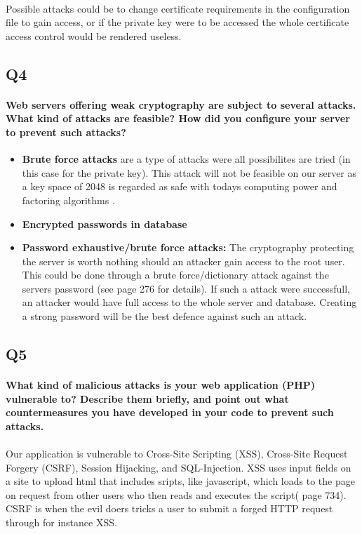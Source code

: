 \documentclass[a4paper,11pt]{article}
\begin{document}
\paragraph{}Possible attacks could be to change certificate requirements in the configuration file to gain access, or if the private key were to be accessed the whole certificate access control would be rendered useless.
\subsection{Q4}
\paragraph{Web servers offering weak cryptography are subject to several attacks. What kind of attacks are feasible? How did you conﬁgure your server to prevent such attacks?}
\begin{itemize}
	\item \textbf{Brute force attacks} are a type of attacks were all possibilites are tried (in this case for the private key). This attack will not be feasible on our server as a key space of 2048 is regarded as safe with todays computing power and factoring algorithms \cite{5}.
	\item \textbf{Encrypted passwords in database} 
	\item \textbf{Password exhaustive/brute force attacks:} The cryptography protecting the server is worth nothing should an attacker gain access to the root user. This could be done through a brute force/dictionary attack against the servers password (see \cite{6} page  276 for details). If such a attack were successfull, an attacker would have full access to the whole server and database. Creating a strong password will be the best defence against such an attack.
\end{itemize}
\subsection{Q5}
\paragraph{What kind of malicious attacks is your web application (PHP) vulnerable to? Describe
them brieﬂy, and point out what countermeasures you have developed in your code to prevent
such attacks.}
\paragraph{}Our application is vulnerable to Cross-Site Scripting (XSS), Cross-Site Request Forgery (CSRF), Session Hijacking, and SQL-Injection. XSS uses input fields on a site to upload html that includes sripts, like javascript, which loads to the page on request from other users who then reads and executes the script(\cite{8} page 734). CSRF is when the evil doers tricks a user to submit a forged HTTP request through for instance XSS.
\end{document}
